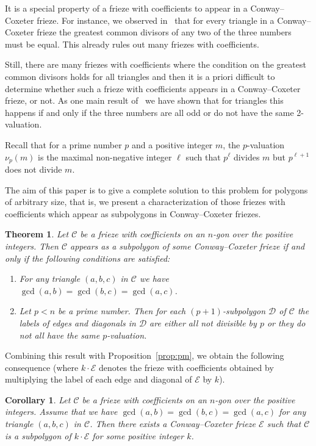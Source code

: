\documentclass[10pt]{amsart}
\numberwithin{equation}{section}
\newtheorem*{theo*}{Theorem}
\newtheorem*{coro*}{Corollary}
\theoremstyle{definition}
\theoremstyle{remark}
\begin{document}
It is a special property of a frieze with coefficients to appear in a Conway--Coxeter
frieze. For instance, we observed in~\cite{CHJ} that for every triangle in
a Conway--Coxeter frieze the greatest common divisors of any two of the three 
numbers must be equal. This already rules out many friezes with coefficients. 

Still, there are many friezes with coefficients where the condition on the greatest
common divisors holds for all triangles and then it is a priori difficult to
determine whether such a frieze with coefficients appears in a Conway--Coxeter
frieze, or not. As one main result of~\cite{CHJ} we have shown that for triangles 
this happens if and only if the three numbers are all odd or do not have the 
same 2-valuation. 

Recall that for a prime number $p$ and a positive integer $m$, the $p$-valuation 
$\nu_p(m)$ is the maximal non-negative integer $\ell$ such that $p^{\ell}$ divides $m$
but $p^{\ell+1}$ does not divide $m$.

The aim of this paper is to give a complete solution to this problem for polygons of
arbitrary size, that is, we present a 
characterization of those friezes with coefficients which appear as subpolygons 
in Conway--Coxeter friezes. 

\begin{theo*}
Let $\mathcal{C}$ be a frieze with coefficients 
on an $n$-gon over the positive integers. Then $\mathcal{C}$ appears as a subpolygon
of some Conway--Coxeter frieze if and only if the following conditions are
satisfied:
\begin{enumerate}
\item \label{cond0:gcd}
For any triangle $(a,b,c)$ in $\mathcal{C}$ we have
$\gcd(a,b)=\gcd(b,c)=\gcd(a,c)$.
\item \label{cond0:p+1}
Let $p<n$ be a prime number. Then for each $(p+1)$-subpolygon $\mathcal{D}$
of $\mathcal{C}$ the labels of edges and diagonals in $\mathcal{D}$ are either
all not divisible by $p$ or they do not all have the same $p$-valuation.
\end{enumerate}
\end{theo*}

Combining this result with Proposition~\ref{prop:pm}, we obtain the following 
consequence (where $k\cdot \mathcal{E}$ denotes the frieze with coefficients
obtained by multiplying the label of each edge and diagonal 
of $\mathcal{E}$ by $k$).

\begin{coro*}
Let $\mathcal{C}$ be a frieze with coefficients on an $n$-gon over the positive integers.
Assume that we have $\gcd(a,b)=\gcd(b,c)=\gcd(a,c)$ for any triangle $(a,b,c)$ in $\mathcal{C}$.
Then there exists a Conway--Coxeter frieze $\mathcal{E}$ such that $\mathcal{C}$ is a subpolygon of $k\cdot \mathcal{E}$ for some positive integer $k$.
\end{coro*}
\end{document}
